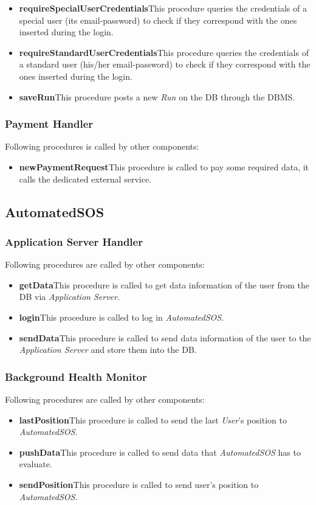 \begin{itemize}
  \item \textbf{requireSpecialUserCredentials}\quad This procedure queries the credentials of a special user (its email-password) to check if they correspond with the ones inserted during the login.
  \item \textbf{requireStandardUserCredentials}\quad This procedure queries the credentials of a standard user (his/her email-password) to check if they correspond with the ones inserted during the login.
  \item \textbf{saveRun}\quad This procedure posts a new \textit{Run} on the DB through the DBMS.
\end{itemize}

\subsubsection{Payment Handler}
Following procedures is called by other components:
\begin{itemize}
  \item \textbf{newPaymentRequest}\quad This procedure is called to pay some required data, it calls the dedicated external service.
\end{itemize}

\subsection{AutomatedSOS}
\subsubsection{Application Server Handler}
Following procedures are called by other components:
\begin{itemize}
  \item \textbf{getData}\quad This procedure is called to get data information of the user from the DB via \textit{Application Server}.
  \item \textbf{login}\quad This procedure is called to log in \textit{AutomatedSOS}.
  \item \textbf{sendData}\quad This procedure is called to send data information of the user to the \textit{Application Server} and store them into the DB.
\end{itemize}

\subsubsection{Background Health Monitor}
Following procedures are called by other components:
\begin{itemize}
  \item \textbf{lastPosition}\quad This procedure is called to send the last \textit{User}'s position to \textit{AutomatedSOS}.
  \item \textbf{pushData}\quad This procedure is called to send data that \textit{AutomatedSOS} has to evaluate.
  \item \textbf{sendPosition}\quad This procedure is called to send user's position to \textit{AutomatedSOS}.
\end{itemize}

